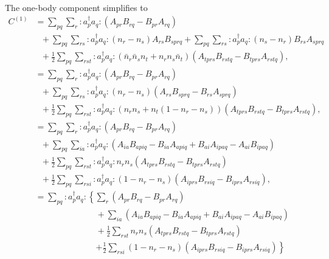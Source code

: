 \documentclass[12pt]{article}
\begin{document}
\noindent The one-body component simplifies to
\begin{align}
C^{(1)} &= \sum_{pq}\sum_{r} :a_p^\dagger a_q:(A_{pr}B_{rq}-B_{pr}A_{rq})\\
& \ \ \ + \sum_{pq}\sum_{rs} :a_p^\dagger a_q: (n_r-n_s) A_{rs}B_{sprq} + \sum_{pq}\sum_{rs} :a_p^\dagger a_q: (n_s-n_r) B_{rs}A_{sprq} \\
& \ \ \  + \frac{1}{2} \sum_{pq}\sum_{rst} :a_p^\dagger a_q: (\bar{n}_r \bar{n}_s n_t + n_r n_s \bar{n}_t) (A_{tprs}B_{rstq}-B_{tprs}A_{rstq}),\\
&= \sum_{pq}\sum_{r} :a_p^\dagger a_q:(A_{pr}B_{rq}-B_{pr}A_{rq})\\
& \ \ \  + \sum_{pq}\sum_{rs} :a_p^\dagger a_q: (n_r-n_s) (A_{rs}B_{sprq}-B_{rs}A_{sprq})\\
& \ \ \ + \frac{1}{2} \sum_{pq}\sum_{rst} :a_p^\dagger a_q: (n_r n_s + n_t(1-n_r-n_s)) (A_{tprs}B_{rstq}-B_{tprs}A_{rstq}),\\
&= \sum_{pq}\sum_{r} :a_p^\dagger a_q:(A_{pr}B_{rq}-B_{pr}A_{rq}) \\
& \ \ \ + \sum_{pq}\sum_{ia} :a_p^\dagger a_q: ( A_{ia}B_{apiq}-B_{ia}A_{apiq}+B_{ai}A_{ipaq} -A_{ai}B_{ipaq} ) \\
& \ \ \ + \frac{1}{2} \sum_{pq}\sum_{rst} :a_p^\dagger a_q: n_r n_s (A_{tprs}B_{rstq}-B_{tprs}A_{rstq})\\
& \ \ \ + \frac{1}{2} \sum_{pq}\sum_{rsi} :a_p^\dagger a_q: (1-n_r-n_s) (A_{iprs}B_{rsiq}-B_{iprs}A_{rsiq}),\\
&= \sum_{pq} :a_p^\dagger a_q: \left\{  \sum_{r} (A_{pr}B_{rq}-B_{pr}A_{rq}) \right. \\
& \hspace{3cm} + \sum_{ia} (A_{ia}B_{apiq}-B_{ia}A_{apiq}+B_{ai}A_{ipaq} -A_{ai}B_{ipaq} ) \\
& \hspace{3cm} + \frac{1}{2} \sum_{rst} n_r n_s (A_{tprs}B_{rstq}-B_{tprs}A_{rstq})\\
& \hspace{3cm} \left. + \frac{1}{2} \sum_{rsi} (1-n_r-n_s) (A_{iprs}B_{rsiq}-B_{iprs}A_{rsiq}) \right\} 
\end{align}
\end{document}
